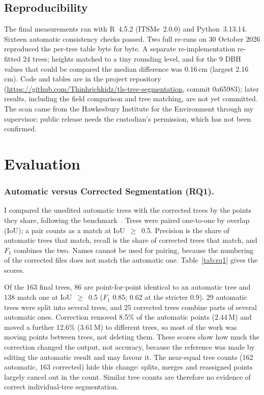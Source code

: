 \documentclass[runningheads]{llncs}
\begin{document}
\subsection{Reproducibility}\label{sec:repro}
{\sloppy The final measurements ran with R~4.5.2 (ITSMe~2.0.0) and Python~3.13.14. Sixteen automatic consistency checks passed. Two full re-runs on 30 October 2026 reproduced the per-tree table byte for byte. A separate re-implementation re-fitted 24 trees; heights matched to a tiny rounding level, and for the 9 DBH values that could be compared the median difference was 0.16\,cm (largest 2.16\,cm). Code and tables are in the project repository (\url{https://github.com/Thinhrichkidz/tls-tree-segmentation}, commit 0a65983); later results, including the field comparison and tree matching, are not yet committed. The scan came from the Hawkesbury Institute for the Environment through my supervisor; public release needs the custodian's permission, which has not been confirmed.\par}

\section{Evaluation}\label{sec:eval}
\subsubsection{Automatic versus Corrected Segmentation (RQ1).}
I compared the unedited automatic trees with the corrected trees by the points they share, following the benchmark~\cite{cherlet2026}. Trees were paired one-to-one by overlap (IoU); a pair counts as a match at IoU~$\geq$~0.5. Precision is the share of automatic trees that match, recall is the share of corrected trees that match, and $F_1$ combines the two. Names cannot be used for pairing, because the numbering of the corrected files does not match the automatic one. Table~\ref{tab:rq1} gives the scores.

Of the 163 final trees, 86 are point-for-point identical to an automatic tree and 138 match one at IoU~$\geq$~0.5 ($F_1$ 0.85; 0.62 at the stricter 0.9). 29 automatic trees were split into several trees, and 25 corrected trees combine parts of several automatic ones. Correction removed 8.5\% of the automatic points (2.44\,M) and moved a further 12.6\% (3.61\,M) to different trees, so most of the work was moving points between trees, not deleting them. These scores show how much the correction changed the output, not accuracy, because the reference was made by editing the automatic result and may favour it. The near-equal tree counts (162 automatic, 163 corrected) hide this change: splits, merges and reassigned points largely cancel out in the count. Similar tree counts are therefore no evidence of correct individual-tree segmentation.
\end{document}
